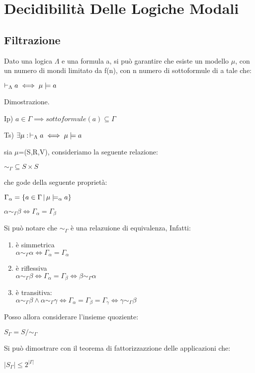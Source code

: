 
\chapter{Decidibilità Delle Logiche Modali}


\section{Filtrazione}

Dato una logica $\Lambda$ e una formula a, si può garantire che esiste
un modello $\mu$, con un numero di mondi limitato da f(n), con n
numero di sottoformule di a tale che:

$\vdash_{\Lambda}a\iff\mu\models a$

Dimostrazione.

Ip) $a\in\Gamma\implies sottoformule(a)\subseteq\Gamma$

Ts) $\exists\mu:\,\vdash_{\Lambda}a\iff\mu\models a$

sia $\mu$=(S,R,V), consideriamo la seguente relazione:

$\sim_{\Gamma}\subseteq S\times S$

che gode della seguente proprietà:

$\Gamma_{\alpha}=\{a\in\Gamma\,|\,\mu\models_{\alpha}a\}$

$\alpha\sim_{\Gamma}\beta\iff\Gamma_{\alpha}=\Gamma_{\beta}$

Si può notare che $\sim_{\Gamma}$ è una relazuione di equivalenza,
Infatti:
\begin{enumerate}
\item è simmetrica\\
$\alpha\sim_{\Gamma}\alpha\iff\Gamma_{\alpha}=\Gamma_{\alpha}$
\item è riflessiva\\
$\alpha\sim_{\Gamma}\beta\iff\Gamma_{\alpha}=\Gamma_{\beta}\iff\beta\sim_{\Gamma}\alpha$
\item è transitiva:\\
$\alpha\sim_{\Gamma}\beta\wedge\alpha\sim_{\Gamma}\gamma\iff\Gamma_{\alpha}=\Gamma_{\beta}=\Gamma_{\gamma}\iff\gamma\sim_{\Gamma}\beta$
\end{enumerate}
Posso allora considerare l'insieme quoziente:

$S_{\Gamma}=S/\sim_{\Gamma}$

Si può dimostrare con il teorema di fattorizzazzione delle applicazioni
che:

$|S_{\Gamma}|\leq2^{|\Gamma|}$

